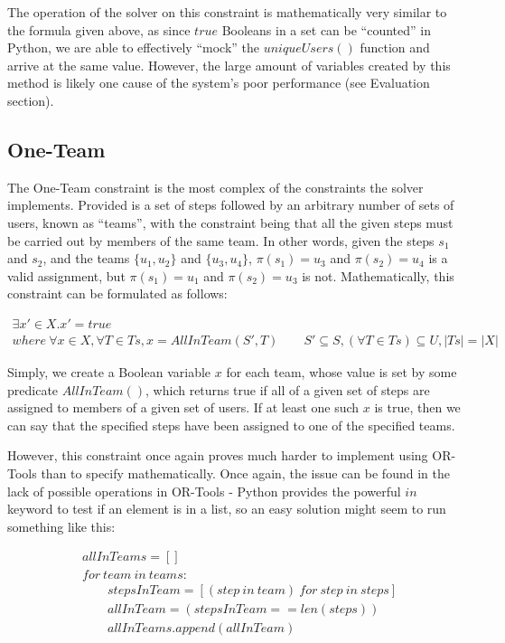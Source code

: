 \documentclass[11pt]{article}
\begin{document}
			The operation of the solver on this constraint is mathematically very similar to the formula given above,
			as since \(true\) Booleans in a set can be ``counted'' in Python,
			we are able to effectively ``mock'' the \(uniqueUsers()\) function and arrive at the same value.
			However, the large amount of variables created by this method is likely one cause of the system's poor performance (see Evaluation section).

		\subsection{One-Team}

			The One-Team constraint is the most complex of the constraints the solver implements.
			Provided is a set of steps followed by an arbitrary number of sets of users,
			known as ``teams'', with the constraint being that all the given steps must be carried out
			by members of the same team. In other words, given the steps \(s_1\) and \(s_2\),
			and the teams \(\{u_1, u_2\}\) and \(\{u_3, u_4\}\),
			\(\pi(s_1) = u_3\) and \(\pi(s_2) = u_4\) is a valid assignment, but \(\pi(s_1) = u_1\) and \(\pi(s_2) = u_3\) is not.
			Mathematically, this constraint can be formulated as follows:

			\begin{multline}
				\exists x' \in X . x' = true \\ where \ \forall x \in X, \forall T \in Ts, x = AllInTeam(S', T) \qquad S' \subseteq S, (\forall T \in Ts) \subseteq U, |Ts| = |X|
			\end{multline}

			Simply, we create a Boolean variable \(x\) for each team, whose value is set by some predicate \(AllInTeam()\),
			which returns true if all of a given set of steps are assigned to members of a given set of users.
			If at least one such \(x\) is true, then we can say that the specified steps have been assigned to one of the specified teams.

			However, this constraint once again proves much harder to implement using OR-Tools than to specify mathematically.
			Once again, the issue can be found in the lack of possible operations in OR-Tools -
			Python provides the powerful \(in\) keyword to test if an element is in a list,
			so an easy solution might seem to run something like this:

			\begin{align*}
				&allInTeams = [] \\
				&for \ team \ in \ teams:\\
				&\qquad stepsInTeam = [(step \ in \ team) \ for \ step \ in \ steps]\\
				&\qquad allInTeam = (stepsInTeam == len(steps))\\
				&\qquad allInTeams.append(allInTeam)
			\end{align*}
\end{document}
